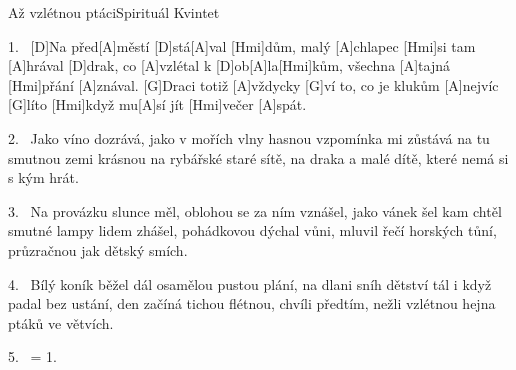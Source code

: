 \begin{song}{Až vzlétnou ptáci}{Spirituál Kvintet}


\begin{xverse}{1.~}
[D]Na před[A]městí [D]stá[A]val [Hmi]dům, malý [A]chlapec [Hmi]si tam [A]hrával
[D]drak, co [A]vzlétal k [D]ob[A]la[Hmi]kům, všechna [A]tajná [Hmi]přání [A]znával.
[G]Draci totiž [A]vždycky [G]ví to, co je klukům [A]nejvíc [G]líto
[Hmi]když mu[A]sí jít [Hmi]večer [A]spát.
\end{xverse}

\begin{xverse}{2.~}
Jako víno dozrává, jako v mořích vlny hasnou
vzpomínka mi zůstává na tu smutnou zemi krásnou
na rybářské staré sítě, na draka a malé dítě,
které nemá si s kým hrát.
\end{xverse}

\begin{xverse}{3.~}
Na provázku slunce měl, oblohou se za ním vznášel,
jako vánek šel kam chtěl smutné lampy lidem zhášel,
pohádkovou dýchal vůni, mluvil řečí horských tůní,
průzračnou jak dětský smích.
\end{xverse}

\begin{xverse}{4.~}
Bílý koník běžel dál osamělou pustou plání,
na dlani sníh dětství tál i když padal bez ustání,
den začíná tichou flétnou, chvíli předtím, nežli vzlétnou
hejna ptáků ve větvích.
\end{xverse}

\begin{xverse}{5.~}
= 1.
\end{xverse}

\end{song}

